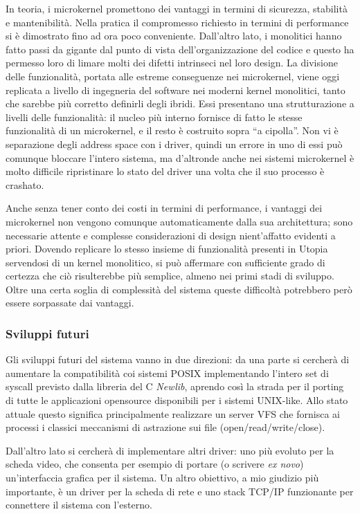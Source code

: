 \documentclass[12pt,a4paper]{report}
\newcommand{\vir}[1]{``#1''}
\begin{document}
	In teoria, i microkernel promettono dei vantaggi in termini di sicurezza, stabilità e mantenibilità. Nella pratica il compromesso
	richiesto in termini di performance si è dimostrato fino ad ora poco conveniente.
	Dall'altro lato, i monolitici hanno fatto passi da gigante dal punto di vista dell'organizzazione del codice e questo ha permesso
	loro di limare molti dei difetti intrinseci nel loro design. La divisione delle funzionalità, portata alle estreme conseguenze nei
	microkernel, viene oggi replicata a livello di ingegneria del software nei moderni kernel monolitici, tanto che sarebbe più corretto
	definirli degli ibridi.
	Essi presentano una strutturazione a livelli delle funzionalità: il nucleo più interno fornisce di fatto le stesse funzionalità di un
	microkernel, e il resto è costruito sopra \vir{a cipolla}. Non vi è separazione degli address space con i driver, quindi un errore
	in uno di essi può comunque bloccare l'intero sistema, ma d'altronde anche nei sistemi microkernel è molto difficile ripristinare
	lo stato del driver una volta che il suo processo è crashato.

	Anche senza tener conto dei costi in termini di performance, i vantaggi dei microkernel non vengono comunque automaticamente
	dalla sua architettura; sono necessarie attente e complesse considerazioni di design nient'affatto evidenti a priori.
	Dovendo replicare lo stesso insieme di funzionalità presenti in Utopia servendosi di un kernel monolitico, si può affermare con
	sufficiente grado di certezza che ciò risulterebbe più semplice, almeno nei primi stadi di sviluppo. Oltre una certa
	soglia di complessità del sistema queste difficoltà potrebbero però essere sorpassate dai vantaggi.
	
	\subsubsection{Sviluppi futuri}
		Gli sviluppi futuri del sistema vanno in due direzioni: da una parte si cercherà di aumentare la compatibilità coi sistemi
		POSIX implementando l'intero set di syscall previsto dalla libreria del C \emph{Newlib}, aprendo così la strada per il porting
		di tutte le applicazioni opensource disponibili per i sistemi UNIX-like.
		Allo stato attuale questo significa principalmente realizzare un server VFS che fornisca ai processi i classici meccanismi
		di astrazione sui file (open/read/write/close).
		
		Dall'altro lato si cercherà di implementare altri driver: uno più evoluto per la scheda video, che consenta per esempio di portare (o scrivere \emph{ex novo})
		un'interfaccia grafica per il sistema. Un altro obiettivo, a mio giudizio più importante, è un driver per la scheda di rete e uno stack TCP/IP funzionante
		per connettere il sistema con l'esterno.
				
\end{document}
